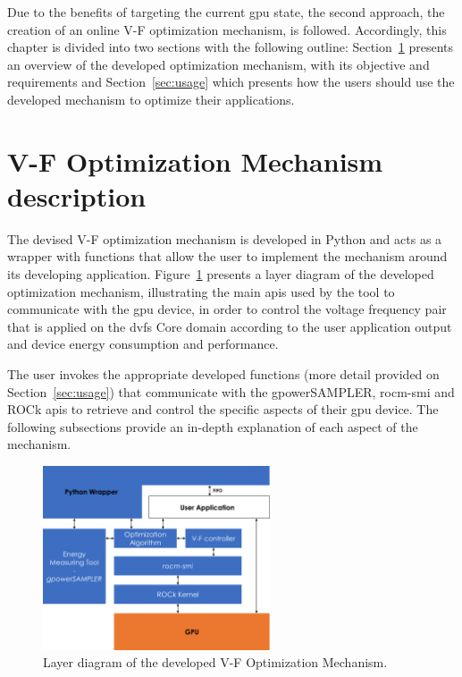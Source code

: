 Due to the benefits of targeting the current \acrshort{gpu} state, the second approach, the creation of an online V-F optimization mechanism, is followed. 
Accordingly, this chapter is divided into two sections with the following outline: Section~\ref{section:opt} presents an overview  of the developed optimization mechanism, with its objective and requirements and Section~\ref{sec:usage} which presents how the users should use the developed mechanism to optimize their applications.



\section{V-F Optimization Mechanism description}
\label{section:opt}

The devised V-F optimization mechanism is developed in Python and acts as a wrapper with functions that allow the user to implement the mechanism around its developing application. Figure~\ref{fig:layer} presents a layer diagram of the developed optimization mechanism, illustrating the main \acrshort{api}s used by the tool to communicate with the \acrshort{gpu} device, in order to control the voltage frequency pair that is applied on the \acrshort{dvfs} Core domain according to the user application output and device energy consumption and performance.

The user invokes the appropriate developed functions (more detail provided on Section~\ref{sec:usage}) that communicate with the gpowerSAMPLER, rocm-smi and ROCk \acrshort{api}s to retrieve and control the specific aspects of their \acrshort{gpu} device. The following subsections provide an in-depth explanation of each aspect of the mechanism.

\begin{figure}[htb]
  \centering
  \includegraphics[width=0.6\textwidth]{Figures/Optimization/layerDiagram.pdf}
  \caption{Layer diagram of the developed V-F Optimization Mechanism.}
  \label{fig:layer}
\end{figure}



